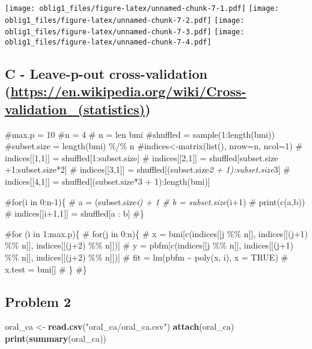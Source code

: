 \documentclass[
]{article}
\newenvironment{Shaded}{\begin{snugshade}}{\end{snugshade}}
\newcommand{\KeywordTok}[1]{\textcolor[rgb]{0.13,0.29,0.53}{\textbf{#1}}}
\newcommand{\NormalTok}[1]{#1}
\newcommand{\StringTok}[1]{\textcolor[rgb]{0.31,0.60,0.02}{#1}}
\begin{document}
\texttt{[image: oblig1\_files/figure-latex/unnamed-chunk-7-1.pdf]}
\texttt{[image: oblig1\_files/figure-latex/unnamed-chunk-7-2.pdf]}
\texttt{[image: oblig1\_files/figure-latex/unnamed-chunk-7-3.pdf]}
\texttt{[image: oblig1\_files/figure-latex/unnamed-chunk-7-4.pdf]}

\hypertarget{c---leave-p-out-cross-validation-httpsen.wikipedia.orgwikicross-validation_statistics}{%
\subsection{\texorpdfstring{C - Leave-p-out cross-validation
(\url{https://en.wikipedia.org/wiki/Cross-validation_(statistics)})}{C - Leave-p-out cross-validation (https://en.wikipedia.org/wiki/Cross-validation\_(statistics))}}\label{c---leave-p-out-cross-validation-httpsen.wikipedia.orgwikicross-validation_statistics}}

\#max.p = 10 \#n = 4 \# n = len bmi \#shuffled = sample(1:length(bmi))
\#subset.size = length(bmi) \%/\% n \#indices\textless-matrix(list(),
nrow=n, ncol=1) \# indices{[}{[}1,1{]}{]} = shuffled{[}1:subset.size{]}
\# indices{[}{[}2,1{]}{]} = shuffled{[}subset.size +1:subset.size*2{]}
\# indices{[}{[}3,1{]}{]} = shuffled{[}(subset.size\emph{2 +
1):subset.size}3{]} \# indices{[}{[}4,1{]}{]} =
shuffled{[}(subset.size*3 + 1):length(bmi){]}

\#for(i in 0:n-1)\{ \# a = (subset.size\emph{i) + 1 \# b =
subset.size}(i+1) \# print(c(a,b)) \# indices{[}{[}i+1,1{]}{]} =
shuffled{[}a : b{]} \#\}

\#for (i in 1:max.p)\{ \# for(j in 0:n)\{ \# x = bmi{[}c(indices{[}{[}j
\%\% n{]}{]}, indices{[}{[}(j+1) \%\% n{]}{]}, indices{[}{[}(j+2) \%\%
n{]}{]}){]} \# y = pbfm{[}c(indices{[}{[}j \%\% n{]}{]},
indices{[}{[}(j+1) \%\% n{]}{]}, indices{[}{[}(j+2) \%\% n{]}{]}){]} \#
fit = lm(pbfm \textasciitilde{} poly(x, i), x = TRUE) \# x.test =
bmi{[}{]} \# \} \#\}

\hypertarget{problem-2}{%
\subsection{Problem 2}\label{problem-2}}

\begin{Shaded}
\begin{Highlighting}[]
\NormalTok{oral_ca <-}\StringTok{ }\KeywordTok{read.csv}\NormalTok{(}\StringTok{"oral_ca/oral_ca.csv"}\NormalTok{)}
\KeywordTok{attach}\NormalTok{(oral_ca)}
\KeywordTok{print}\NormalTok{(}\KeywordTok{summary}\NormalTok{(oral_ca))}
\end{Highlighting}
\end{Shaded}
\end{document}
